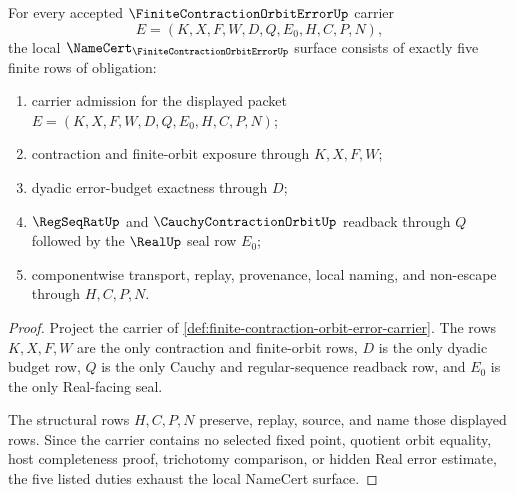 \begin{theorem}
\label{thm:finite-contraction-orbit-error-namecert-obligations}
For every accepted $\FiniteContractionOrbitErrorUp$ carrier
$$
E=(K,X,F,W,D,Q,E_0,H,C,P,N),
$$
the local $\NameCert_{\FiniteContractionOrbitErrorUp}$ surface consists of exactly five finite rows of obligation:
\begin{enumerate}
\item carrier admission for the displayed packet $E=(K,X,F,W,D,Q,E_0,H,C,P,N)$;
\item contraction and finite-orbit exposure through $K,X,F,W$;
\item dyadic error-budget exactness through $D$;
\item $\RegSeqRatUp$ and $\CauchyContractionOrbitUp$ readback through $Q$ followed by the $\RealUp$ seal row $E_0$;
\item componentwise transport, replay, provenance, local naming, and non-escape through $H,C,P,N$.
\end{enumerate}
\end{theorem}
\begin{proof}
Project the carrier of \autoref{def:finite-contraction-orbit-error-carrier}. The rows $K,X,F,W$ are the only contraction and finite-orbit rows, $D$ is the only dyadic budget row, $Q$ is the only Cauchy and regular-sequence readback row, and $E_0$ is the only Real-facing seal.

The structural rows $H,C,P,N$ preserve, replay, source, and name those displayed rows. Since the carrier contains no selected fixed point, quotient orbit equality, host completeness proof, trichotomy comparison, or hidden Real error estimate, the five listed duties exhaust the local NameCert surface.
\end{proof}

